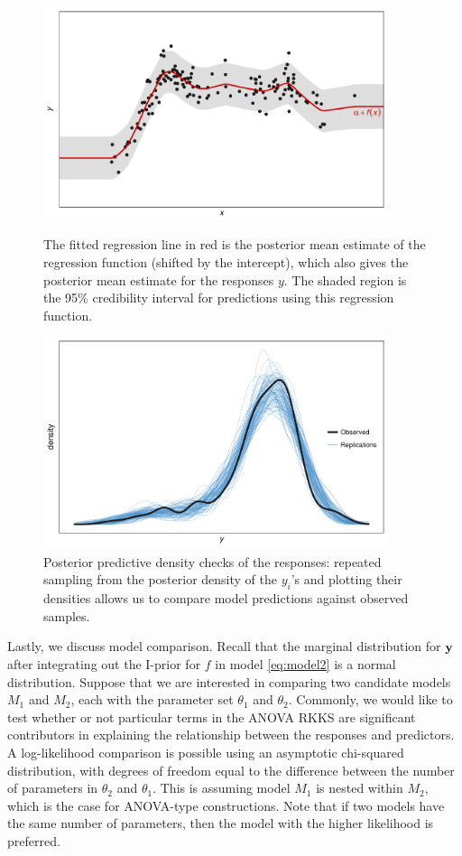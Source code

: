 \begin{figure}[p]
  \centering
  \includegraphics[width=0.9\textwidth]{figure/04-post_reg_cred}
  \caption{The fitted regression line in red is the posterior mean estimate of the regression function (shifted by the intercept), which also gives the posterior mean estimate for the responses $y$. The shaded region is the 95\% credibility interval for predictions using this regression function.}
  \vspace{1em}
  \includegraphics[width=0.9\textwidth]{figure/04-post_reg_ppc}
  \caption{Posterior predictive density checks of the responses: repeated sampling from the posterior density of the $y_i$'s and plotting their densities allows us to compare model predictions against observed samples.}
\end{figure}

Lastly, we discuss model comparison.
Recall that the marginal distribution for ${\mathbf y}$ after integrating out the I-prior for $f$ in model \eqref{eq:model2} is a normal distribution.
Suppose that we are interested in comparing two candidate models $M_1$ and $M_2$, each with the parameter set $\theta_1$ and $\theta_2$.
Commonly, we would like to test whether or not particular terms in the ANOVA RKKS are significant contributors in explaining the relationship between the responses and predictors.
A log-likelihood comparison is possible using an asymptotic chi-squared distribution, with degrees of freedom equal to the difference between the number of parameters in $\theta_2$ and $\theta_1$.
This is assuming model $M_1$ is nested within $M_2$, which is the case for ANOVA-type constructions.
Note that if two models have the same number of parameters, then the model with the higher likelihood is preferred.

